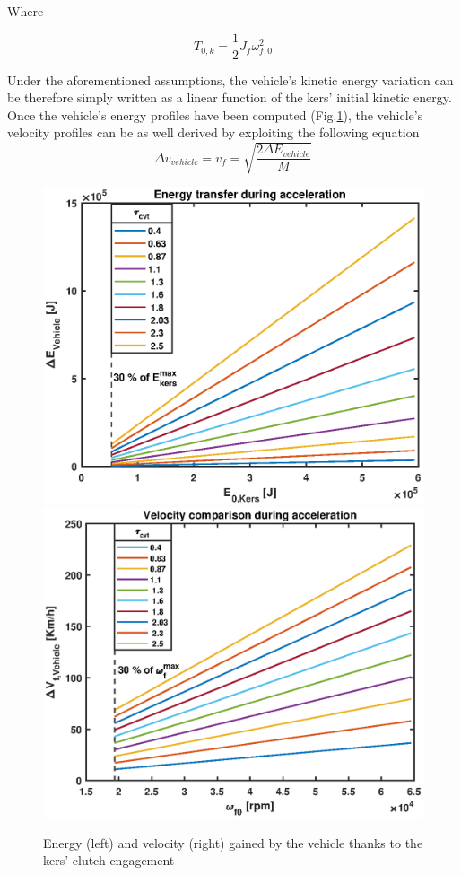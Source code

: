 \documentclass[11pt]{article}
\begin{document}
Where

\begin{equation}
T_{0,k} = \frac{1}{2}J_f\omega_{f,0}^2
\end{equation}

Under the aforementioned assumptions, the vehicle's kinetic energy variation can be therefore simply written as a linear function of the kers' initial kinetic energy. Once the vehicle's energy profiles have been computed (Fig.\ref{en_comp_acc}), the vehicle's velocity profiles can be as well derived by exploiting the following equation
\begin{equation}
\Delta v_{vehicle} = v_f = \sqrt{\frac{2\Delta E_{vehicle}}{M}}
\end{equation}

\begin{figure}[H]
\captionsetup{font=small, justification=centering}
\centering
\includegraphics[width=.49\textwidth]{Images/Results_new/Univariate_SteadyState/en_comp_acc.eps}\hfill
\includegraphics[width=.49\textwidth]{Images/Results_new/Univariate_SteadyState/vel_comp_acc.eps}
\caption{Energy (left) and velocity (right) gained by the vehicle thanks to the kers' clutch engagement}
\label{en_comp_acc}
\end{figure}
\end{document}
